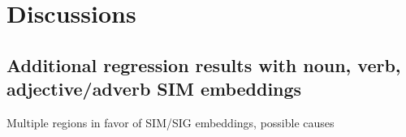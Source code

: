 \chapter{Discussions} %

\label{chap:discussions} %


\section{Additional regression results with noun, verb, adjective/adverb SIM embeddings}
Multiple regions in favor of SIM/SIG embeddings, possible causes

